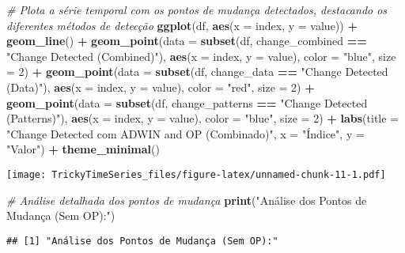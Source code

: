 \documentclass[
]{article}
\newenvironment{Shaded}{\begin{snugshade}}{\end{snugshade}}
\newcommand{\AttributeTok}[1]{\textcolor[rgb]{0.13,0.29,0.53}{#1}}
\newcommand{\CommentTok}[1]{\textcolor[rgb]{0.56,0.35,0.01}{\textit{#1}}}
\newcommand{\DecValTok}[1]{\textcolor[rgb]{0.00,0.00,0.81}{#1}}
\newcommand{\FunctionTok}[1]{\textcolor[rgb]{0.13,0.29,0.53}{\textbf{#1}}}
\newcommand{\NormalTok}[1]{#1}
\newcommand{\SpecialCharTok}[1]{\textcolor[rgb]{0.81,0.36,0.00}{\textbf{#1}}}
\newcommand{\StringTok}[1]{\textcolor[rgb]{0.31,0.60,0.02}{#1}}
\begin{document}
\begin{Shaded}
\begin{Highlighting}[]
\CommentTok{\# Plota a série temporal com os pontos de mudança detectados, destacando os diferentes métodos de detecção}
\FunctionTok{ggplot}\NormalTok{(df, }\FunctionTok{aes}\NormalTok{(}\AttributeTok{x =}\NormalTok{ index, }\AttributeTok{y =}\NormalTok{ value)) }\SpecialCharTok{+}
  \FunctionTok{geom\_line}\NormalTok{() }\SpecialCharTok{+}
  \FunctionTok{geom\_point}\NormalTok{(}\AttributeTok{data =} \FunctionTok{subset}\NormalTok{(df, change\_combined }\SpecialCharTok{==} \StringTok{"Change Detected (Combined)"}\NormalTok{), }\FunctionTok{aes}\NormalTok{(}\AttributeTok{x =}\NormalTok{ index, }\AttributeTok{y =}\NormalTok{ value), }\AttributeTok{color =} \StringTok{"blue"}\NormalTok{, }\AttributeTok{size =} \DecValTok{2}\NormalTok{) }\SpecialCharTok{+}
  \FunctionTok{geom\_point}\NormalTok{(}\AttributeTok{data =} \FunctionTok{subset}\NormalTok{(df, change\_data }\SpecialCharTok{==} \StringTok{"Change Detected (Data)"}\NormalTok{), }\FunctionTok{aes}\NormalTok{(}\AttributeTok{x =}\NormalTok{ index, }\AttributeTok{y =}\NormalTok{ value), }\AttributeTok{color =} \StringTok{"red"}\NormalTok{, }\AttributeTok{size =} \DecValTok{2}\NormalTok{) }\SpecialCharTok{+}
  \FunctionTok{geom\_point}\NormalTok{(}\AttributeTok{data =} \FunctionTok{subset}\NormalTok{(df, change\_patterns }\SpecialCharTok{==} \StringTok{"Change Detected (Patterns)"}\NormalTok{), }\FunctionTok{aes}\NormalTok{(}\AttributeTok{x =}\NormalTok{ index, }\AttributeTok{y =}\NormalTok{ value), }\AttributeTok{color =} \StringTok{"blue"}\NormalTok{, }\AttributeTok{size =} \DecValTok{2}\NormalTok{) }\SpecialCharTok{+}
  \FunctionTok{labs}\NormalTok{(}\AttributeTok{title =} \StringTok{"Change Detected com ADWIN and OP (Combinado)"}\NormalTok{, }\AttributeTok{x =} \StringTok{"Índice"}\NormalTok{, }\AttributeTok{y =} \StringTok{"Valor"}\NormalTok{) }\SpecialCharTok{+}
  \FunctionTok{theme\_minimal}\NormalTok{()}
\end{Highlighting}
\end{Shaded}

\texttt{[image: TrickyTimeSeries\_files/figure-latex/unnamed-chunk-11-1.pdf]}

\begin{Shaded}
\begin{Highlighting}[]
\CommentTok{\# Análise detalhada dos pontos de mudança}
\FunctionTok{print}\NormalTok{(}\StringTok{"Análise dos Pontos de Mudança (Sem OP):"}\NormalTok{)}
\end{Highlighting}
\end{Shaded}

\begin{verbatim}
## [1] "Análise dos Pontos de Mudança (Sem OP):"
\end{verbatim}
\end{document}
